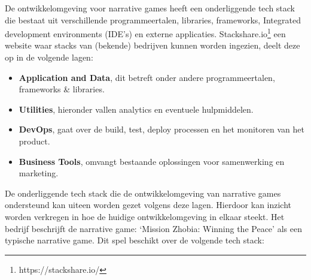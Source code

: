 De ontwikkelomgeving voor narrative games heeft een onderliggende tech stack die bestaat uit verschillende programmeertalen, libraries, frameworks, Integrated development environments (IDE’s) en externe applicaties. Stackshare.io\footnote{https://stackshare.io/} een website waar stacks van (bekende) bedrijven kunnen worden ingezien, deelt deze op in de volgende lagen\cite{StackShareCategories}:

\begin{itemize}
    \item \textbf{Application and Data}, dit betreft onder andere programmeertalen, frameworks \& libraries.
    \item \textbf{Utilities}, hieronder vallen analytics en eventuele hulpmiddelen.
    \item \textbf{DevOps}, gaat over de build, test, deploy processen en het monitoren van het product.
    \item \textbf{Business Tools}, omvangt bestaande oplossingen voor samenwerking en marketing.
\end{itemize}

De onderliggende tech stack die de ontwikkelomgeving van narrative games ondersteund kan uiteen worden gezet volgens deze lagen. Hierdoor kan inzicht worden verkregen in hoe de huidige ontwikkelomgeving in elkaar steekt. Het bedrijf beschrijft de narrative game: ‘Mission Zhobia: Winning the Peace’ als een typische narrative game. Dit spel beschikt over de volgende tech stack:


